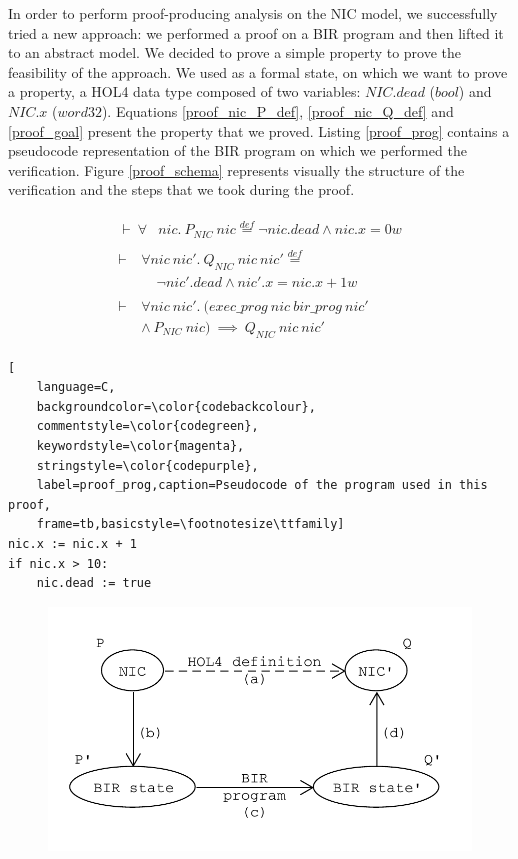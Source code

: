 \documentclass[10pt,a4paper]{article}
\newcommand{\eqdef}{\stackrel{def}{=}}
\begin{document}
\begin{multicols}{2}
In order to perform proof-producing analysis on the NIC model, we successfully tried a new approach: we performed a proof on a BIR program and then lifted it to an abstract model. We decided to prove a simple property to prove the feasibility of the approach. We used as a formal state, on which we want to prove a property, a HOL4 data type composed of two variables: $NIC.dead$ ($bool$) and $NIC.x$ ($word32$). Equations \ref{proof_nic_P_def}, \ref{proof_nic_Q_def} and \ref{proof_goal} present the property that we proved. Listing \ref{proof_prog} contains a pseudocode representation of the BIR program on which we performed the verification. Figure \ref{proof_schema} represents visually the structure of the verification and the steps that we took during the proof.
%
\begin{small}
\begin{align}
  \begin{split}
    \label{proof_nic_P_def}
    \vdash~\forall &nic.~P_{NIC}~nic \eqdef \neg nic.dead \land nic.x = 0w
  \end{split}\\
  \begin{split}
    \label{proof_nic_Q_def}
    \vdash~&\forall nic~nic'.~Q_{NIC}~nic~nic' \eqdef\\
      &~~~~~\neg nic'.dead \land nic'.x = nic.x + 1w
  \end{split}\\
  \begin{split}
    \label{proof_goal}
    \vdash~&\forall nic~nic'.~(exec\_prog~nic~bir\_prog~nic'\\
      &\land~P_{NIC}~nic)~\implies~Q_{NIC}~nic~nic'
  \end{split}
\end{align}
\end{small}
%
\begin{lstlisting}[
    language=C,
    backgroundcolor=\color{codebackcolour},
    commentstyle=\color{codegreen},
    keywordstyle=\color{magenta},
    stringstyle=\color{codepurple},
    label=proof_prog,caption=Pseudocode of the program used in this proof,
    frame=tb,basicstyle=\footnotesize\ttfamily]
nic.x := nic.x + 1
if nic.x > 10:
    nic.dead := true
\end{lstlisting}
%
\begin{figure}[H]
	\includegraphics[width=\columnwidth]{figures/proof_schema.pdf}

\end{figure}
\end{multicols}
\end{document}
